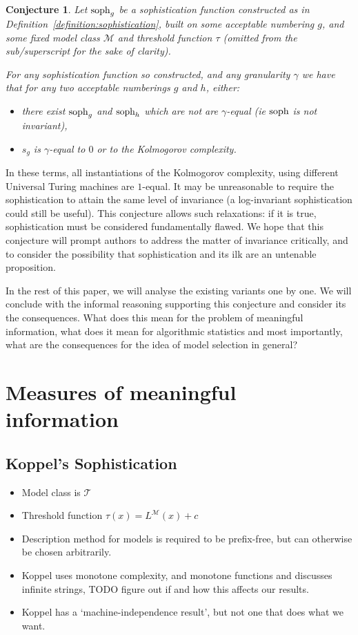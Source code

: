 \documentclass{style/llncs}
\newcommand{\M}{\mathscr M}
\newcommand{\T}{\mathscr T}
\newcommand{\tn}[1]{\textnormal{#1}}
\newcommand{\s}{\tn{soph}}
\newtheorem{conj}{Conjecture}
\begin{document}
\begin{conj}
Let $\s_g$ be a sophistication function constructed as in Definition~\ref{definition:sophistication}, built on some acceptable numbering $g$, and some fixed model class $\M$ and threshold function $\tau$ (omitted from the sub/superscript for the sake of clarity). 

For any sophistication function so constructed, and any granularity $\gamma$ we have that for any two acceptable numberings $g$ and $h$, either:
\begin{itemize}
  \item there exist $\s_g$ and $\s_h$ which are not are $\gamma$-equal (ie $\s$ is not invariant),
  \item $s_g$ is $\gamma$-equal to $0$ or to the Kolmogorov complexity.
\end{itemize}
\end{conj}

In these terms, all instantiations of the Kolmogorov complexity, using different Universal Turing machines are $1$-equal. It may be unreasonable to require the sophistication to attain the same level of invariance (a log-invariant sophistication could still be useful). This conjecture allows such relaxations: if it is true, sophistication must be considered fundamentally flawed. We hope that this conjecture will prompt authors to address the matter of invariance critically, and to consider the possibility that sophistication and its ilk are an untenable proposition.

In the rest of this paper, we will analyse the existing variants one by one. We will conclude with the informal reasoning supporting this conjecture and consider its the consequences. What does this mean for the problem of meaningful information, what does it mean for algorithmic statistics and most importantly, what are the consequences for the idea of model selection in general?

\section{Measures of meaningful information}

\subsection{Koppel's Sophistication}


\begin{itemize}
\item Model class is $\T$
\item Threshold function $\tau(x)=L^\M(x)+c$
\item Description method for models is required to be prefix-free, but
  can otherwise be chosen arbitrarily.
\item Koppel uses monotone complexity, and monotone functions and discusses 
  infinite strings, TODO figure out if and how this affects our results.
  \item Koppel has a `machine-independence result', but not one that does what we want.
\end{itemize}
\end{document}
